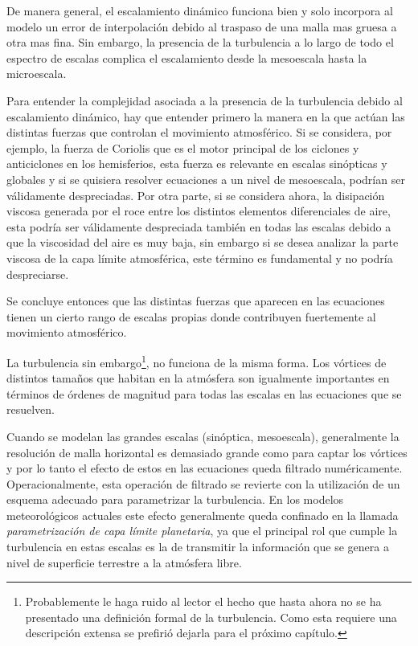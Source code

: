 De manera general, el escalamiento dinámico funciona bien y solo incorpora al modelo un error de interpolación debido al traspaso de una malla mas gruesa a otra mas fina. Sin embargo, la presencia de la turbulencia a lo largo de todo el espectro de escalas complica el escalamiento desde la mesoescala hasta la microescala.

Para entender la complejidad asociada a la presencia de la turbulencia debido al escalamiento dinámico, hay que entender primero la manera en la que actúan las distintas fuerzas que controlan el movimiento atmosférico. Si se considera, por ejemplo, la fuerza de Coriolis que es el motor principal de los ciclones y anticiclones en los hemisferios, esta fuerza es relevante en escalas sinópticas y globales y si se quisiera resolver ecuaciones a un nivel de mesoescala, podrían ser válidamente despreciadas. Por otra parte, si se considera ahora, la disipación viscosa generada por el roce entre los distintos elementos diferenciales de aire, esta podría ser válidamente despreciada también en todas las escalas debido a que la viscosidad del aire es muy baja, sin embargo si se desea analizar la parte viscosa de la capa límite atmosférica, este término es fundamental y no podría despreciarse. 
 
Se concluye entonces que las distintas fuerzas que aparecen en las ecuaciones tienen un cierto rango de escalas propias donde contribuyen fuertemente al movimiento atmosférico. 

La turbulencia sin embargo\footnote{Probablemente le haga ruido al lector el hecho que hasta ahora no se ha presentado una definición formal de la turbulencia. Como esta requiere una descripción extensa se prefirió dejarla para el próximo capítulo.}, no funciona de la misma forma. Los vórtices de distintos tamaños que habitan en la atmósfera son igualmente importantes en términos de órdenes de magnitud para todas las escalas en las ecuaciones que se resuelven.

Cuando se modelan las grandes escalas (sinóptica, mesoescala), generalmente la resolución de malla horizontal es demasiado grande como para captar los vórtices y por lo tanto el efecto de estos en las ecuaciones queda filtrado numéricamente. Operacionalmente, esta operación de filtrado se revierte con la utilización de un esquema adecuado para parametrizar la turbulencia. En los modelos meteorológicos actuales este efecto generalmente queda confinado en la llamada \emph{parametrización de capa límite planetaria}, ya que el principal rol que cumple la turbulencia en estas escalas es la de transmitir la información que se genera a nivel de superficie terrestre a la atmósfera libre.

